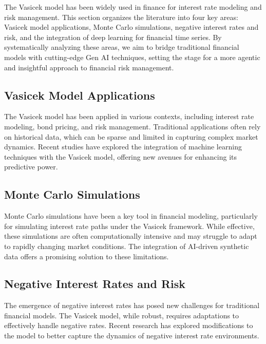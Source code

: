\documentclass[a4paper,headinclude=on,footinclude=on,12pt,oneside]{scrbook}
\begin{document}
	
	The Vasicek model has been widely used in finance for interest rate modeling and risk management. This section organizes the literature into four key areas: Vasicek model applications, Monte Carlo simulations, negative interest rates and risk, and the integration of deep learning for financial time series. By systematically analyzing these areas, we aim to bridge traditional financial models with cutting-edge Gen AI techniques, setting the stage for a more agentic and insightful approach to financial risk management.
	
	\subsection{Vasicek Model Applications}
	
	The Vasicek model has been applied in various contexts, including interest rate modeling, bond pricing, and risk management. Traditional applications often rely on historical data, which can be sparse and limited in capturing complex market dynamics. Recent studies have explored the integration of machine learning techniques with the Vasicek model, offering new avenues for enhancing its predictive power.
	
	\subsection{Monte Carlo Simulations}
	
	Monte Carlo simulations have been a key tool in financial modeling, particularly for simulating interest rate paths under the Vasicek framework. While effective, these simulations are often computationally intensive and may struggle to adapt to rapidly changing market conditions. The integration of AI-driven synthetic data offers a promising solution to these limitations.
	
	\subsection{Negative Interest Rates and Risk}
	
	The emergence of negative interest rates has posed new challenges for traditional financial models. The Vasicek model, while robust, requires adaptations to effectively handle negative rates. Recent research has explored modifications to the model to better capture the dynamics of negative interest rate environments.
	
\end{document}
